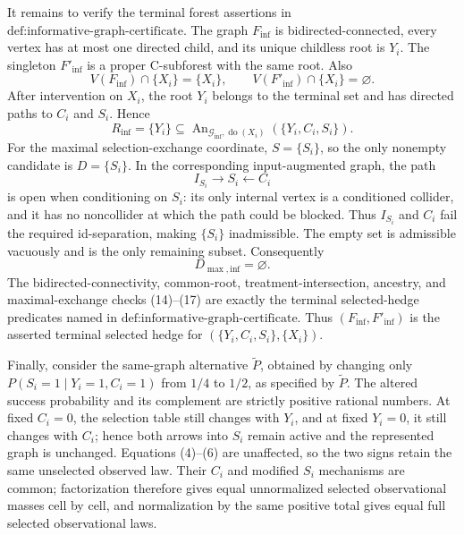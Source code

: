 It remains to verify the terminal forest assertions in \(\text{def:informative-graph-certificate}\).  The graph \(F_{\mathrm{inf}}\) is bidirected-connected, every vertex has at most one directed child, and its unique childless root is \(Y_i\).  The singleton \(F'_{\mathrm{inf}}\) is a proper C-subforest with the same root.  Also
\[
 V(F_{\mathrm{inf}})\cap\{X_i\}=\{X_i\},
 \qquad
 V(F'_{\mathrm{inf}})\cap\{X_i\}=\varnothing.          \tag{14}
\]
After intervention on \(X_i\), the root \(Y_i\) belongs to the terminal set and has directed paths to \(C_i\) and \(S_i\).  Hence
\[
 R_{\mathrm{inf}}=\{Y_i\}
 \subseteq\operatorname{An}_{\mathcal G_{\mathrm{inf}},\operatorname{do}(X_i)}
 (\{Y_i,C_i,S_i\}).                                     \tag{15}
\]
For the maximal selection-exchange coordinate, \(S=\{S_i\}\), so the only nonempty candidate is \(D=\{S_i\}\).  In the corresponding input-augmented graph, the path
\[
 I_{S_i}\longrightarrow S_i\longleftarrow C_i           \tag{16}
\]
is open when conditioning on \(S_i\): its only internal vertex is a conditioned collider, and it has no noncollider at which the path could be blocked.  Thus \(I_{S_i}\) and \(C_i\) fail the required id-separation, making \(\{S_i\}\) inadmissible.  The empty set is admissible vacuously and is the only remaining subset.  Consequently
\[
 D_{\max,\mathrm{inf}}=\varnothing.                     \tag{17}
\]
The bidirected-connectivity, common-root, treatment-intersection, ancestry, and maximal-exchange checks (14)--(17) are exactly the terminal selected-hedge predicates named in \(\text{def:informative-graph-certificate}\).  Thus \((F_{\mathrm{inf}},F'_{\mathrm{inf}})\) is the asserted terminal selected hedge for \((\{Y_i,C_i,S_i\},\{X_i\})\).

Finally, consider the same-graph alternative \(\widetilde P\), obtained by changing only \(P(S_i=1\mid Y_i=1,C_i=1)\) from \(1/4\) to \(1/2\), as specified by \(\widetilde P\).  The altered success probability and its complement are strictly positive rational numbers.  At fixed \(C_i=0\), the selection table still changes with \(Y_i\), and at fixed \(Y_i=0\), it still changes with \(C_i\); hence both arrows into \(S_i\) remain active and the represented graph is unchanged.  Equations (4)--(6) are unaffected, so the two signs retain the same unselected observed law.  Their \(C_i\) and modified \(S_i\) mechanisms are common; factorization therefore gives equal unnormalized selected observational masses cell by cell, and normalization by the same positive total gives equal full selected observational laws.


